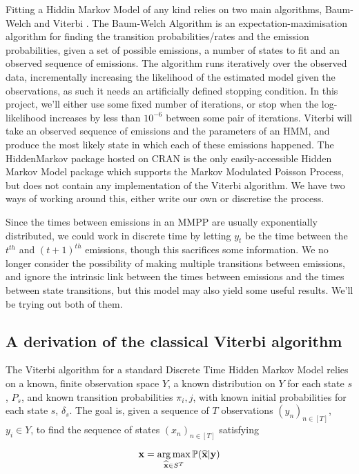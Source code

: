 Fitting a Hiddin Markov Model of any kind relies on two main algorithms, Baum-Welch \cite{baumwelch} and Viterbi \cite{viterbi}. The Baum-Welch Algorithm is an expectation-maximisation algorithm for finding the transition probabilities/rates and the emission probabilities, given a set of possible emissions, a number of states to fit and an observed sequence of emissions. The algorithm runs iteratively over the observed data, incrementally increasing the likelihood of the estimated model given the observations, as such it needs an artificially defined stopping condition. In this project, we'll either use some fixed number of iterations, or stop when the log-likelihood increases by less than $10^{-6}$ between some pair of iterations. Viterbi will take an observed sequence of emissions and the parameters of an HMM, and produce the most likely state in which each of these emissions happened. The HiddenMarkov package hosted on CRAN \cite{hiddenmarkov} is the only easily-accessible Hidden Markov Model package which supports the Markov Modulated Poisson Process, but does not contain any implementation of the Viterbi algorithm. We have two ways of working around this, either write our own or discretise the process.

Since the times between emissions in an MMPP are usually exponentially distributed, we could work in discrete time by letting $y_t$ be the time between the $t^{th}$ and $(t+1)^{th}$ emissions, though this sacrifices some information. We no longer consider the possibility of making multiple transitions between emissions, and ignore the intrinsic link between the times between emissions and the times between state transitions, but this model may also yield some useful results. We'll be trying out both of them.

\subsection{A derivation of the classical Viterbi algorithm}

The Viterbi algorithm for a standard Discrete Time Hidden Markov Model relies on a known, finite observation space $Y$, a known distribution on $Y$ for each state $s$, $P_s$, and known transition probabilities $\pi_i,j$, with known initial probabilities for each state $s$, $\delta_s$. The goal is, given a sequence of $T$ observations $(y_n)_{n \in [T]}$, $y_i \in Y$, to find the sequence of states $(x_n)_{n \in [T]}$ satisfying

$$
\mathbf{x} = \operatorname*{arg\,max}_{\widehat{\mathbf{x}} \in S^T} \mathbb{P}(\mathbf{\widehat{x}} | \mathbf{y})
$$


